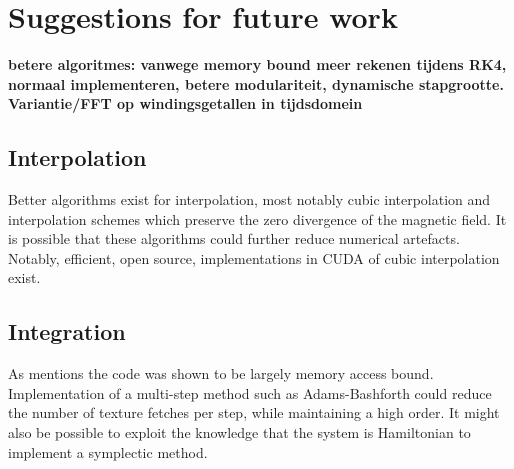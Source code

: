 \documentclass{article}
\begin{document}
\section{Suggestions for future work}
{\bf betere algoritmes: vanwege memory bound meer rekenen tijdens RK4, normaal implementeren, betere modulariteit, dynamische stapgrootte. Variantie/FFT op windingsgetallen in tijdsdomein}
\subsection{Interpolation}
Better algorithms exist for interpolation, most notably cubic interpolation and interpolation schemes which preserve the zero divergence of the magnetic field\cite{McNally01052011}. It is possible that these algorithms could further reduce numerical artefacts. %
Notably, efficient, open source, implementations in CUDA of cubic interpolation exist.\cite{Ruijters01012012}
\subsection{Integration}
As mentions the code was shown to be largely memory access bound. Implementation of a multi-step method such as Adams-Bashforth could reduce the number of texture fetches per step, while maintaining a high order.
It might also be possible to exploit the knowledge that the system is Hamiltonian to implement a symplectic method.


\end{document}
